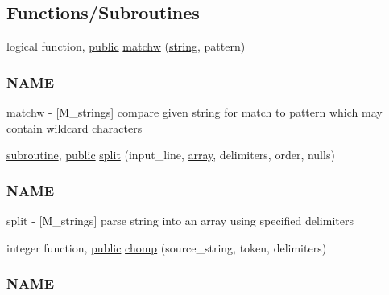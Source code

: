 \subsection*{Functions/\+Subroutines}
\begin{DoxyCompactItemize}
\item 
logical function, \hyperlink{M__stopwatch_83_8txt_a2f74811300c361e53b430611a7d1769f}{public} \hyperlink{namespacem__strings_a1f9a363d0432f7373ef6a388f5893b0e}{matchw} (\hyperlink{what__overview_81_8txt_a74cb7e955273b9f9157b4f0c18a38849}{string}, pattern)
\begin{DoxyCompactList}\small\item\em \subsubsection*{N\+A\+ME}

matchw -\/ \mbox{[}M\+\_\+strings\mbox{]} compare given string for match to pattern which may contain wildcard characters \end{DoxyCompactList}\item 
\hyperlink{M__stopwatch_83_8txt_acfbcff50169d691ff02d4a123ed70482}{subroutine}, \hyperlink{M__stopwatch_83_8txt_a2f74811300c361e53b430611a7d1769f}{public} \hyperlink{namespacem__strings_a3f0119fab962146c7656cad592dd9acd}{split} (input\+\_\+line, \hyperlink{intro__blas1_83_8txt_a89db1945e1a335ab0184c6a097821e32}{array}, delimiters, order, nulls)
\begin{DoxyCompactList}\small\item\em \subsubsection*{N\+A\+ME}

split -\/ \mbox{[}M\+\_\+strings\mbox{]} parse string into an array using specified delimiters \end{DoxyCompactList}\item 
integer function, \hyperlink{M__stopwatch_83_8txt_a2f74811300c361e53b430611a7d1769f}{public} \hyperlink{namespacem__strings_aa3fc15a665eeff512b7f5269029f558d}{chomp} (source\+\_\+string, token, delimiters)
\begin{DoxyCompactList}\small\item\em \subsubsection*{N\+A\+ME}


\end{DoxyCompactList}
\end{DoxyCompactItemize}
